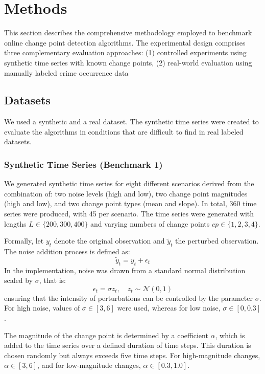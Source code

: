 \documentclass[journal,article,submit,pdftex,moreauthors]{Definitions/mdpi}
\begin{document}
\section{Methods}
\label{sec:methods}
This section describes the comprehensive methodology employed to benchmark online change point detection algorithms. The experimental design comprises three complementary evaluation approaches: (1) controlled experiments using synthetic time series with known change points, (2) real-world evaluation using manually labeled crime occurrence data
\subsection{Datasets}
We used a synthetic and a real dataset. The synthetic time series were created to evaluate the algorithms in conditions that are difficult to find in real labeled datasets.
\subsubsection{Synthetic Time Series (Benchmark 1)}
We generated synthetic time series for eight different scenarios derived from the combination of: two noise levels (high and low), two change point magnitudes (high and low), and two change point types (mean and slope). In total, 360 time series were produced, with 45 per scenario. The time series were generated with lengths $L \in \{200, 300, 400\}$ and varying numbers of change points $cp \in \{1, 2, 3, 4\}$.

Formally, let $y_t$ denote the original observation and $\tilde{y}_t$ the perturbed observation.  
The noise addition process is defined as:
\begin{equation}
    \tilde{y}_t = y_t + \epsilon_t
\end{equation}
In the implementation, noise was drawn from a standard normal distribution scaled by $\sigma$, that is:
\begin{equation}
    \epsilon_t = \sigma z_t, \quad z_t \sim \mathcal{N}(0, 1)
\end{equation}
ensuring that the intensity of perturbations can be controlled by the parameter $\sigma$. For high noise, values of $\sigma \in [3, 6]$ were used, whereas for low noise, $\sigma \in [0, 0.3]$.

The magnitude of the change point is determined by a coefficient $\alpha$, which is added to the time series over a defined duration of time steps. This duration is chosen randomly but always exceeds five time steps. For high-magnitude changes, $\alpha \in [3, 6]$, and for low-magnitude changes, $\alpha \in [0.3, 1.0]$.
\end{document}
